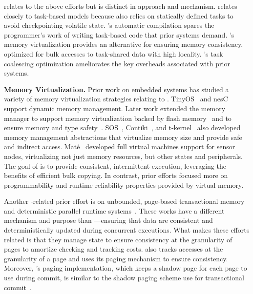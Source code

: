 \sys relates to the above efforts but is distinct in approach and mechanism. \sys relates closely to task-based models because \sys also relies on statically defined tasks to avoid checkpointing volatile state. \sys's automatic compilation spares the programmer's work of writing task-based code that prior systems demand. \sys's memory virtualization provides an alternative for ensuring memory consistency, optimized for bulk accesses to task-shared data with high locality. \sys's task coalescing optimization ameliorates the key overheads associated with prior systems.

\textbf{Memory Virtualization.} Prior work on embedded systems has studied a variety of memory virtualization strategies relating to \sys. TinyOS~\cite{levis2005tinyos} and nesC~\cite{nesc} support dynamic memory management. Later work extended the memory manager to support memory virtualization backed by flash memory~\cite{sensornetvm} and to ensure memory and type safety~\cite{tinyosmemorysafety}. SOS~\cite{sos}, Contiki~\cite{contiki}, and
t-kernel~\cite{tkernel} also developed memory management abstractions that
virtualize memory size and provide safe and indirect access. Mat\'e~\cite{mate} developed full virtual machines support for sensor nodes, virtualizing not just memory resources, but other states and peripherals. The goal of \sys is to provide consistent, intermittent execution, leveraging the benefits of efficient bulk copying. In contrast, prior efforts focused more on programmability and runtime reliability properties provided by virtual memory.

Another \sys-related prior effort is on unbounded, page-based transactional memory and deterministic parallel runtime systems~\cite{pagebasedtm,grace}. These works have a different mechanism and purpose than \sys---ensuring that data are consistent and deterministically updated during concurrent executions. What makes these
efforts related is that they manage state to ensure consistency at the
granularity of pages to amortize checking and tracking costs. \sys also tracks
accesses at the granularity of a page and uses its paging mechanism to ensure
consistency. Moreover, \sys's paging implementation, which keeps a shadow page
for each page to use during commit, is similar to the shadow paging scheme
use for transactional commit~\cite{pagebasedtm}.